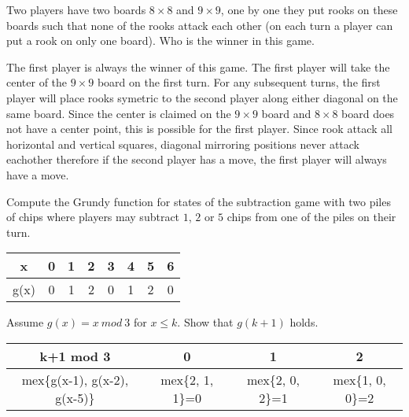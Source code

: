 \documentclass[addpoints,answers]{exam}
\begin{document}
    \pagestyle{headandfoot}
    \runningheadrule

    \firstpagefooter{}{}{}
    \runningfooter{}{}{}
    \begin{flushright}

        \vspace{0.2in}

    \end{flushright}

    \begin{questions}
        \question[10]
            Two players have two boards $8 \times 8$ and $9 \times 9$, one by one they put
            rooks on these boards such that none of the rooks attack each other (on each
            turn a player can put a rook on only one board). Who is the
            winner in this game.
            \begin{solutionorbox}[\stretch{1}]
							The first player is always the winner of this game. The first
							player will take the center of the $9 \times 9$ board on the first
							turn. For any subsequent turns, the first player will place rooks
							symetric to the second player along either diagonal on the same
							board. Since the center is claimed on the $9\times 9$ board and
							$8\times 8$ board does not have a center point, this is possible
							for the first player. Since rook attack all horizontal and
							vertical squares, diagonal mirroring positions never attack
							eachother therefore if the second player has a move, the first
							player will always have a move.
            \end{solutionorbox}
            \newpage
 
        \question
            Compute the Grundy function for states of the subtraction game with two piles of
            chips where players may subtract $1$, $2$ or $5$ chips from one of the piles on
            their turn.
            \begin{solutionorbox}[\stretch{1}]
							\begin{center}
							\begin{tabular}{c||c|c|c|c|c|c|c}
								x & 0 & 1 & 2 & 3 & 4 & 5 & 6\\
								\hline
								g(x) & 0 & 1 & 2 & 0 & 1 & 2 & 0 
							\end{tabular}
							\end{center}
							Assume $g(x) = x\ mod\ 3$ for $x \le k$. Show that $g(k+1)$
							holds.
							\begin{center}
							\begin{tabular}{c||c|c|c}
								k+1 mod 3 & 0 & 1 & 2\\
								\hline
								mex\{g(x-1), g(x-2), g(x-5)\} & mex\{2, 1, 1\}=0 & mex\{2, 0,
								2\}=1 & mex\{1, 0, 0\}=2
							\end{tabular}
							\end{center}


\end{solutionorbox}
\end{questions}
\end{document}
